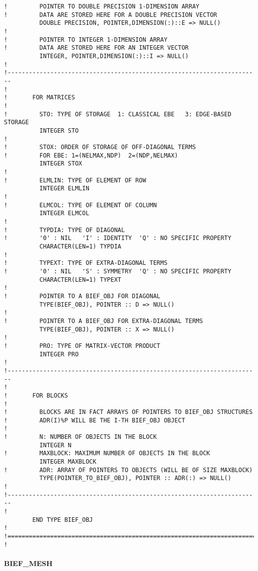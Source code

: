 \begin{lstlisting}[language=TelFortran]
!         POINTER TO DOUBLE PRECISION 1-DIMENSION ARRAY
!         DATA ARE STORED HERE FOR A DOUBLE PRECISION VECTOR
          DOUBLE PRECISION, POINTER,DIMENSION(:)::E => NULL()
!
!         POINTER TO INTEGER 1-DIMENSION ARRAY
!         DATA ARE STORED HERE FOR AN INTEGER VECTOR
          INTEGER, POINTER,DIMENSION(:)::I => NULL()
!
!-----------------------------------------------------------------------
!
!       FOR MATRICES
!
!         STO: TYPE OF STORAGE  1: CLASSICAL EBE   3: EDGE-BASED STORAGE
          INTEGER STO
!
!         STOX: ORDER OF STORAGE OF OFF-DIAGONAL TERMS
!         FOR EBE: 1=(NELMAX,NDP)  2=(NDP,NELMAX)
          INTEGER STOX
!
!         ELMLIN: TYPE OF ELEMENT OF ROW
          INTEGER ELMLIN
!
!         ELMCOL: TYPE OF ELEMENT OF COLUMN
          INTEGER ELMCOL
!
!         TYPDIA: TYPE OF DIAGONAL
!         '0' : NIL   'I' : IDENTITY  'Q' : NO SPECIFIC PROPERTY
          CHARACTER(LEN=1) TYPDIA
!
!         TYPEXT: TYPE OF EXTRA-DIAGONAL TERMS
!         '0' : NIL   'S' : SYMMETRY  'Q' : NO SPECIFIC PROPERTY
          CHARACTER(LEN=1) TYPEXT
!
!         POINTER TO A BIEF_OBJ FOR DIAGONAL
          TYPE(BIEF_OBJ), POINTER :: D => NULL()
!
!         POINTER TO A BIEF_OBJ FOR EXTRA-DIAGONAL TERMS
          TYPE(BIEF_OBJ), POINTER :: X => NULL()
!
!         PRO: TYPE OF MATRIX-VECTOR PRODUCT
          INTEGER PRO
!
!-----------------------------------------------------------------------
!
!       FOR BLOCKS
!
!         BLOCKS ARE IN FACT ARRAYS OF POINTERS TO BIEF_OBJ STRUCTURES
!         ADR(I)%P WILL BE THE I-TH BIEF_OBJ OBJECT
!
!         N: NUMBER OF OBJECTS IN THE BLOCK
          INTEGER N
!         MAXBLOCK: MAXIMUM NUMBER OF OBJECTS IN THE BLOCK
          INTEGER MAXBLOCK
!         ADR: ARRAY OF POINTERS TO OBJECTS (WILL BE OF SIZE MAXBLOCK)
          TYPE(POINTER_TO_BIEF_OBJ), POINTER :: ADR(:) => NULL()
!
!-----------------------------------------------------------------------
!
        END TYPE BIEF_OBJ
!
!=======================================================================
!
\end{lstlisting}

\paragraph{BIEF\_MESH}

